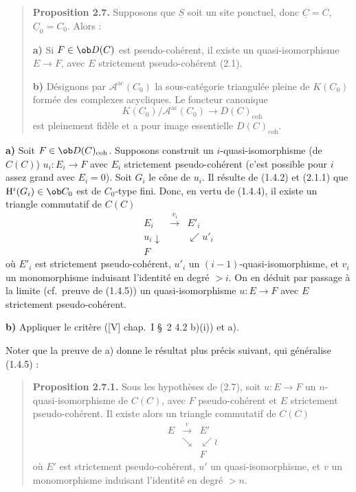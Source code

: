 \begin{quote}
\textbf{Proposition 2.7.} Supposons que $\underline{S}$ soit un site ponctuel, donc $\underline{C} = C$, $\underline{C}_0 = C_0$. Alors :

\textbf{a)} Si $F \in \ob D(C)$ est pseudo-cohérent, il existe un quasi-isomorphisme $E \to F$, avec $E$ strictement pseudo-cohérent (2.1).

\textbf{b)} Désignons par $\mathcal{A}^{\mathrm{ac}}(C_0)$ la sous-catégorie triangulée pleine de $K(C_0)$ formée des complexes acycliques. Le foncteur canonique
\[
K(C_0)/\mathcal{A}^{\mathrm{ac}}(C_0) \longrightarrow D(C)_{\mathrm{coh}}
\]
est pleinement fidèle et a pour image essentielle $D(C)_{\mathrm{coh}}$.
\end{quote}

\textbf{a)} Soit $F \in \ob D(C)_{\mathrm{coh}}$. Supposons construit un $i$-quasi-isomorphisme (de $C(C)$) $u_i : E_i \to F$ avec $E_i$ strictement pseudo-cohérent (c'est possible pour $i$ assez grand avec $E_i = 0$). Soit $G_i$ le cône de $u_i$. Il résulte de (1.4.2) et (2.1.1) que $\mathrm{H}^i(G_i) \in \ob C_0$ est de $C_0$-type fini. Donc, en vertu de (1.4.4), il existe un triangle commutatif de $C(C)$
\[
\begin{array}{ccc}
E_i & \xrightarrow{v_i} & E'_i \\
u_i \downarrow & & \swarrow u'_i \\
F & &
\end{array}
\]
où $E'_i$ est strictement pseudo-cohérent, $u'_i$ un $(i-1)$-quasi-isomorphisme, et $v_i$ un monomorphisme induisant l'identité en degré $> i$. On en déduit par passage à la limite (cf.\ preuve de (1.4.5)) un quasi-isomorphisme $u : E \to F$ avec $E$ strictement pseudo-cohérent.

\textbf{b)} Appliquer le critère ([V] chap.\ I \S\ 2 4.2 b)(i)) et a).

Noter que la preuve de a) donne le résultat plus précis suivant, qui généralise (1.4.5) :

\begin{quote}
\textbf{Proposition 2.7.1.} Sous les hypothèses de (2.7), soit $u : E \to F$ un $n$-quasi-isomorphisme de $C(C)$, avec $F$ pseudo-cohérent et $E$ strictement pseudo-cohérent. Il existe alors un triangle commutatif de $C(C)$
\[
\begin{array}{ccc}
E & \xrightarrow{v} & E' \\
& \searrow & \swarrow \wr \\
& & F
\end{array}
\]
où $E'$ est strictement pseudo-cohérent, $u'$ un quasi-isomorphisme, et $v$ un monomorphisme induisant l'identité en degré $> n$.
\end{quote}

